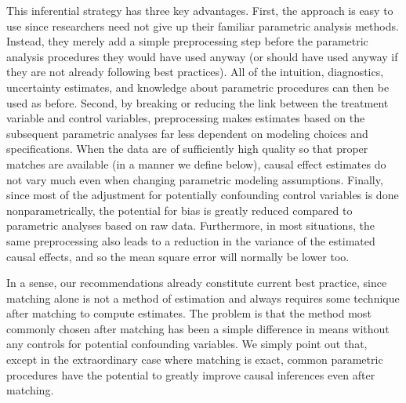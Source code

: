 \documentclass[11pt,titlepage]{article}
\begin{document}
This inferential strategy has three key advantages.  First, the
approach is easy to use since researchers need not give up their
familiar parametric analysis methods.  Instead, they merely add a
simple preprocessing step before the parametric analysis procedures
they would have used anyway (or should have used anyway if they are
not already following best practices).  All of the intuition,
diagnostics, uncertainty estimates, and knowledge about parametric
procedures can then be used as before.  Second, by breaking or
reducing the link between the treatment variable and control
variables, preprocessing makes estimates based on the subsequent
parametric analyses far less dependent on modeling choices and
specifications.  When the data are of sufficiently high quality so
that proper matches are available (in a manner we define below),
causal effect estimates do not vary much even when changing parametric
modeling assumptions.  Finally, since most of the adjustment for
potentially confounding control variables is done nonparametrically,
the potential for bias is greatly reduced compared to parametric
analyses based on raw data.  Furthermore, in most situations, the same
preprocessing also leads to a reduction in the variance of the
estimated causal effects, and so the mean square error will normally
be lower too.

In a sense, our recommendations already constitute current best
practice, since matching alone is not a method of estimation and
always requires some technique after matching to compute estimates.
The problem is that the method most commonly chosen after matching has
been a simple difference in means without any controls for potential
confounding variables.  We simply point out that, except in the
extraordinary case where matching is exact, common parametric
procedures have the potential to greatly improve causal inferences
even after matching.
\end{document}
